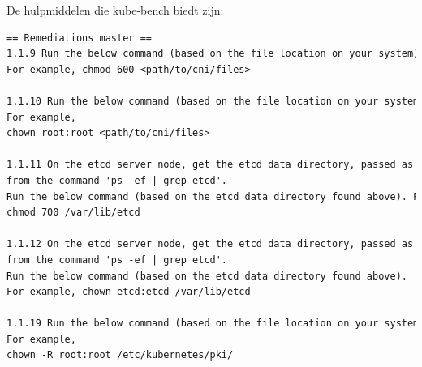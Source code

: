 De hulpmiddelen die kube-bench biedt zijn:
\begin{lstlisting}[language=tex, caption={Remediations master van kube-bench}]
== Remediations master ==
1.1.9 Run the below command (based on the file location on your system) on the control plane node.
For example, chmod 600 <path/to/cni/files>

1.1.10 Run the below command (based on the file location on your system) on the control plane node.
For example,
chown root:root <path/to/cni/files>

1.1.11 On the etcd server node, get the etcd data directory, passed as an argument --data-dir,
from the command 'ps -ef | grep etcd'.
Run the below command (based on the etcd data directory found above). For example,
chmod 700 /var/lib/etcd

1.1.12 On the etcd server node, get the etcd data directory, passed as an argument --data-dir,
from the command 'ps -ef | grep etcd'.
Run the below command (based on the etcd data directory found above).
For example, chown etcd:etcd /var/lib/etcd

1.1.19 Run the below command (based on the file location on your system) on the control plane node.
For example,
chown -R root:root /etc/kubernetes/pki/


\end{lstlisting}
